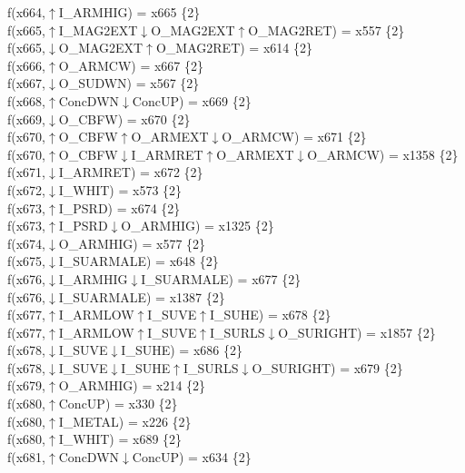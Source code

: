 f(x664,$\uparrow$I\_ARMHIG) = x665 \{2\} \\  
f(x665,$\uparrow$I\_MAG2EXT$\downarrow$O\_MAG2EXT$\uparrow$O\_MAG2RET) = x557 \{2\} \\  
f(x665,$\downarrow$O\_MAG2EXT$\uparrow$O\_MAG2RET) = x614 \{2\} \\  
f(x666,$\uparrow$O\_ARMCW) = x667 \{2\} \\  
f(x667,$\downarrow$O\_SUDWN) = x567 \{2\} \\  
f(x668,$\uparrow$ConcDWN$\downarrow$ConcUP) = x669 \{2\} \\  
f(x669,$\downarrow$O\_CBFW) = x670 \{2\} \\  
f(x670,$\uparrow$O\_CBFW$\uparrow$O\_ARMEXT$\downarrow$O\_ARMCW) = x671 \{2\} \\  
f(x670,$\uparrow$O\_CBFW$\downarrow$I\_ARMRET$\uparrow$O\_ARMEXT$\downarrow$O\_ARMCW) = x1358 \{2\} \\  
f(x671,$\downarrow$I\_ARMRET) = x672 \{2\} \\  
f(x672,$\downarrow$I\_WHIT) = x573 \{2\} \\  
f(x673,$\uparrow$I\_PSRD) = x674 \{2\} \\  
f(x673,$\uparrow$I\_PSRD$\downarrow$O\_ARMHIG) = x1325 \{2\} \\  
f(x674,$\downarrow$O\_ARMHIG) = x577 \{2\} \\  
f(x675,$\downarrow$I\_SUARMALE) = x648 \{2\} \\  
f(x676,$\downarrow$I\_ARMHIG$\downarrow$I\_SUARMALE) = x677 \{2\} \\  
f(x676,$\downarrow$I\_SUARMALE) = x1387 \{2\} \\  
f(x677,$\uparrow$I\_ARMLOW$\uparrow$I\_SUVE$\uparrow$I\_SUHE) = x678 \{2\} \\  
f(x677,$\uparrow$I\_ARMLOW$\uparrow$I\_SUVE$\uparrow$I\_SURLS$\downarrow$O\_SURIGHT) = x1857 \{2\} \\  
f(x678,$\downarrow$I\_SUVE$\downarrow$I\_SUHE) = x686 \{2\} \\  
f(x678,$\downarrow$I\_SUVE$\downarrow$I\_SUHE$\uparrow$I\_SURLS$\downarrow$O\_SURIGHT) = x679 \{2\} \\  
f(x679,$\uparrow$O\_ARMHIG) = x214 \{2\} \\  
f(x680,$\uparrow$ConcUP) = x330 \{2\} \\  
f(x680,$\uparrow$I\_METAL) = x226 \{2\} \\  
f(x680,$\uparrow$I\_WHIT) = x689 \{2\} \\  
f(x681,$\uparrow$ConcDWN$\downarrow$ConcUP) = x634 \{2\} \\  
